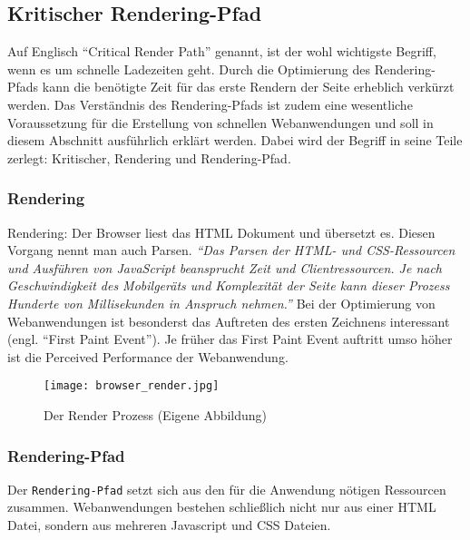	\pagebreak

	\subsection{Kritischer Rendering-Pfad} %
	\label{sub:critical_render_path}
		Auf Englisch "`Critical Render Path"' genannt, ist der wohl wichtigste Begriff, wenn es um schnelle Ladezeiten geht. Durch die Optimierung des Rendering-Pfads kann die benötigte Zeit für das erste Rendern der Seite erheblich verkürzt werden. Das Verständnis des Rendering-Pfads ist zudem eine wesentliche Voraussetzung für die Erstellung von schnellen Webanwendungen und soll in diesem Abschnitt ausführlich erklärt werden. Dabei wird der Begriff in seine Teile zerlegt: Kritischer, Rendering und Rendering-Pfad.

		\subsubsection{Rendering} %
		\label{ssub:rendering}
			Rendering: Der Browser liest das HTML Dokument und übersetzt es. Diesen Vorgang nennt man auch Parsen. \textit{"`Das Parsen der HTML- und CSS-Ressourcen und Ausführen von JavaScript beansprucht Zeit und Clientressourcen. Je nach Geschwindigkeit des Mobilgeräts und Komplexität der Seite kann dieser Prozess Hunderte von Millisekunden in Anspruch nehmen."'}\autocite{google14} Bei der Optimierung von Webanwendungen ist besonderst das Auftreten des ersten Zeichnens interessant (engl. "`First Paint Event"'). Je früher das First Paint Event auftritt umso höher ist die Perceived Performance der Webanwendung.

			\begin{figure}[htbp]
				\begin{center}
					\texttt{[image: browser\_render.jpg]}
					\caption{Der Render Prozess (Eigene Abbildung)}
					\label{fig:browser_render}
				\end{center}
			\end{figure}



		\subsubsection{Rendering-Pfad} %
		\label{ssub:rendering_pfad}

			Der \texttt{Rendering-Pfad} setzt sich aus den für die Anwendung nötigen Ressourcen zusammen. Webanwendungen bestehen schließlich nicht nur aus einer HTML Datei, sondern aus mehreren Javascript und CSS Dateien.

